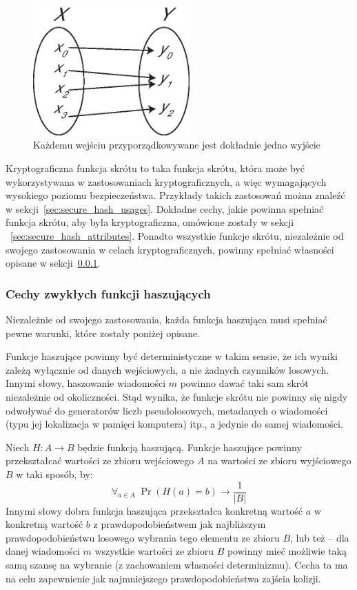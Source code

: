 \documentclass[12pt,a4paper,twoside]{article}
\begin{document}
\begin{figure}[htb!]
\includegraphics[width=6cm]{img/surjection.eps}
\caption{Każdemu wejściu przyporządkowywane jest dokładnie jedno wyjście}
\label{fig:surjection}
\end{figure}

Kryptograficzna funkcja skrótu to taka funkcja skrótu, która może być
wykorzystywana w zastosowaniach kryptograficznych, a więc wymagających
wysokiego poziomu bezpieczeństwa. Przykłady takich zastosowań można znaleźć w
sekcji~\ref{sec:secure_hash_usages}. Dokładne cechy, jakie powinna spełniać
funkcja skrótu, aby była kryptograficzna, omówione zostały w sekcji
~\ref{sec:secure_hash_attributes}. Ponadto wszystkie funkcje skrótu,
niezależnie od swojego zastosowania w celach kryptograficznych, powinny
spełniać własności opisane w sekcji~\ref{sec:common_hash_attributes}.



\subsubsection{Cechy zwykłych funkcji haszujących}
\label{sec:common_hash_attributes}
Niezależnie od swojego zastosowania, każda funkcja haszująca musi spełniać
pewne warunki, które zostały poniżej opisane.

Funkcje haszujące powinny być deterministyczne w takim sensie, że ich wyniki
zależą wyłącznie od danych wejściowych, a nie żadnych czynników losowych.
Innymi słowy, haszowanie wiadomości $m$ powinno dawać taki sam skrót
niezależnie od okoliczności. Stąd wynika, że funkcje skrótu nie powinny się
nigdy odwoływać do generatorów liczb pseudolosowych, metadanych o wiadomości
(typu jej lokalizacja w pamięci komputera) itp., a jedynie do samej wiadomości.

Niech $H : A \to B$ będzie funkcją haszującą. Funkcje haszujące powinny
przekształcać wartości ze zbioru wejściowego $A$ na wartości ze zbioru
wyjściowego $B$ w taki sposób, by:
\[
    \forall_{a \in A} \; \Pr(H(a) = b) \to \frac{1}{|B|}
\]
Innymi słowy dobra funkcja haszująca przekształca konkretną wartość $a$ w
konkretną wartość $b$ z prawdopodobieństwem jak najbliższym prawdopodobieństwu
losowego wybrania tego elementu ze zbioru $B$, lub też -- dla danej wiadomości
$m$ wszystkie wartości ze zbioru $B$ powinny mieć możliwie taką samą szansę na
wybranie (z zachowaniem własności determinizmu). Cecha ta ma na celu
zapewnienie jak najmniejszego prawdopodobieństwa zajścia kolizji.
\end{document}
